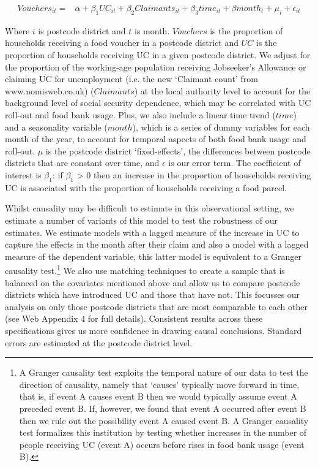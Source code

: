 \documentclass[12pt,article,oneside]{memoir}
\begin{document}
\begin{align}
Vouchers_{it} =& \alpha + \beta_1 UC_{it} + \beta_2 Claimants_{it} + \beta_3 time_{it} + \beta month_t + \mu_i + \epsilon_{it} 
\end{align}


Where $i$ is postcode district and $t$ is month. $Vouchers$ is the proportion of households receiving a food voucher in a postcode district and $UC$ is the proportion of households receiving UC in a given postcode district. We adjust for the proportion of the working-age population receiving Jobseeker’s Allowance or claiming UC for unemployment (i.e. the new `Claimant count' from www.nomisweb.co.uk) ($Claimants$) at the local authority level to account for the background level of social security dependence, which may be correlated with UC roll-out and food bank usage. Plus, we also include a linear time trend ($time$) and a seasonality variable ($month$), which is a series of dummy variables for each month of the year, to account for temporal aspects of both food bank usage and roll-out. $\mu$ is the postcode district `fixed-effects', the differences between postcode districts that are constant over time, and $\epsilon$ is our error term. The coefficient of interest is $\beta_1$: if $\beta_1$ > 0 then an increase in the proportion of households receiving UC is associated with the proportion of households receiving a food parcel. 

Whilst causality may be difficult to estimate in this observational setting, we estimate a number of variants of this model to test the robustness of our estimates. We estimate models with a lagged measure of the increase in UC to capture the effects in the month after their claim and also a model with a lagged measure of the dependent variable, this latter model is equivalent to a Granger causality test.\footnote{A Granger causality test exploits the temporal nature of our data to test the direction of causality, namely that `causes' typically move forward in time, that is, if event A causes event B then we would typically assume event A preceded event B. If, however, we found that event A occurred after event B then we rule out the possibility event A caused event B. A Granger causality test formalizes this institution by testing whether increases in the number of people receiving UC (event A) occurs before rises in food bank usage (event B).}  We also use matching techniques to create a sample that is balanced on the covariates mentioned above and allow us to compare postcode districts which have introduced UC and those that have not. This focusses our analysis on only those postcode districts that are most comparable to each other (see Web Appendix 4 for full details). Consistent results across these specifications gives us more confidence in drawing causal conclusions. Standard errors are estimated at the postcode district level.
\end{document}
